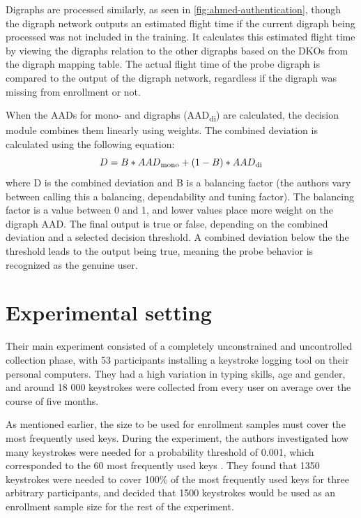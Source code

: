 \documentclass[informationsecurity]{gucmasterproject}
\begin{document}
Digraphs are processed similarly, as seen in \cref{fig:ahmed-authentication}, though the digraph network outputs an estimated flight time if the current digraph being processed was not included in the training.
It calculates this estimated flight time by viewing the digraphs relation to the other digraphs based on the DKOs from the digraph mapping table.
The actual flight time of the probe digraph is compared to the output of the digraph network, regardless if the digraph was missing from enrollment or not.

When the AADs for mono- and digraphs (AAD\textsubscript{di}) are calculated, the decision module combines them linearly using weights.
The combined deviation is calculated using the following equation:
\begin{equation}
D = B * AAD\textsubscript{mono} + (1-B) * AAD\textsubscript{di}
\end{equation}
where D is the combined deviation and B is a balancing factor (the authors vary between calling this a balancing, dependability and tuning factor).
The balancing factor is a value between 0 and 1, and lower values place more weight on the digraph AAD.
The final output is true or false, depending on the combined deviation and a selected decision threshold.
A combined deviation below the the threshold leads to the output being true, meaning the probe behavior is recognized as the genuine user.

\section{Experimental setting}
\label{sec:ahmed-experimental}
Their main experiment consisted of a completely unconstrained and uncontrolled collection phase, with 53 participants installing a keystroke logging tool on their personal computers.
They had a high variation in typing skills, age and gender, and around 18 000 keystrokes were collected from every user on average over the course of five months.

As mentioned earlier, the size to be used for enrollment samples must cover the most frequently used keys.
During the experiment, the authors investigated how many keystrokes were needed for a probability threshold of 0.001, which corresponded to the 60 most frequently used keys \cite{Ahmed}.
They found that 1350 keystrokes were needed to cover 100\% of the most frequently used keys for three arbitrary participants, and decided that 1500 keystrokes would be used as an enrollment sample size for the rest of the experiment.
\end{document}
